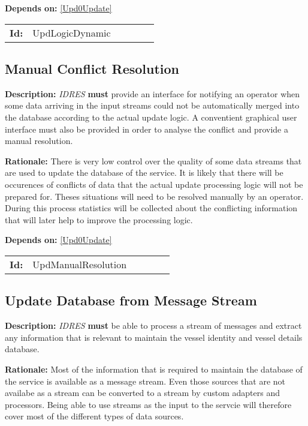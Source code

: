 \textbf{Depends on:} \ref{Upd0Update} 

\par
{\small \begin{center}\begin{tabular}{rlrlrl}
\textbf{Id:} & UpdLogicDynamic  & & & \end{tabular}\end{center} }

\subsection{Manual Conflict Resolution}\label{UpdManualResolution}
\textbf{Description:} \textsl{IDRES} \textbf{must} provide an interface for notifying an operator when some data arriving in the input streams could not be  automatically merged into the  database according to the actual update logic. A conventient graphical  user interface must also be provided in order to analyse the  conflict and provide a manual resolution.

\textbf{Rationale:} There is very low control over the quality of some data streams  that are used to update the database of the service. It is likely that there will be occurences of conflicts of data that the actual update  processing logic will not be prepared for. Theses situations will need to be resolved manually by an operator. During this process statistics will be collected about the conflicting information that will later  help to improve the processing logic. 

\textbf{Depends on:} \ref{Upd0Update} 

\par
{\small \begin{center}\begin{tabular}{rlrlrl}
\textbf{Id:} & UpdManualResolution  & & & \end{tabular}\end{center} }

\subsection{Update Database from Message Stream}\label{UpdStream}
\textbf{Description:} \textsl{IDRES} \textbf{must} be able to process a stream of messages and extract any information that is relevant to maintain the  vessel identity and vessel details database.

\textbf{Rationale:} Most of the information that is required to maintain the  database of the service is available as a message stream. Even those sources that are not availabe as a stream can be converted to a stream by custom adapters and processors. Being able to use streams as the input to the servcie will therefore cover most of the different  types of data sources.

